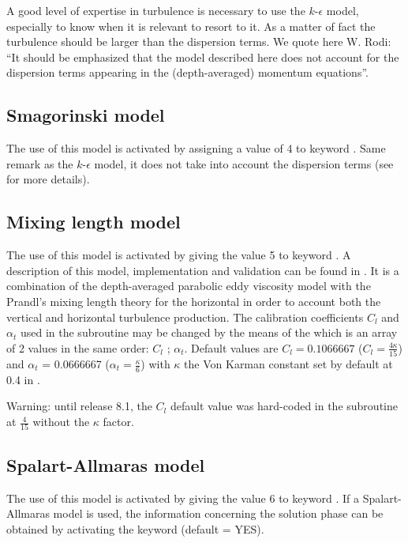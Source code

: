 A good level of expertise in turbulence is necessary to use the $k$-$\epsilon$
model, especially to know when it is relevant to resort to it.
As a matter of fact the turbulence should be larger than the dispersion terms.
We quote here W. Rodi:
``It should be emphasized that the model described here does not account
for the dispersion terms appearing in the (depth-averaged) momentum equations''.


\subsection{Smagorinski model}

The use of this model is activated by assigning a value of 4 to keyword
.
Same remark as the $k$-$\epsilon$ model, it does not take into account the
dispersion terms (see \cite{Smagorinsky1963} for more details).


\subsection{Mixing length model}

The use of this model is activated by giving the value 5 to keyword
.
A description of this model, implementation and validation can be found in
\cite{Dorfmann2016}.
It is a combination of the depth-averaged parabolic eddy viscosity model
with the Prandl's mixing length theory for the horizontal in order to account
both the vertical and horizontal turbulence production.
The calibration coefficients $C_l$ and $\alpha_t$ used in the
 subroutine may be changed by the means of the
 which is an array of 2 values
in the same order: $C_l$ ; $\alpha_t$.
Default values are $C_l = 0.1066667$ ($C_l = \frac{4 \kappa}{15}$) and
$\alpha_t$ = 0.0666667 ($\alpha_t = \frac{\kappa}{6}$)
with $\kappa$ the Von Karman constant set by default at 0.4 in .

Warning: until release 8.1, the $C_l$ default value was hard-coded in the
 subroutine at $\frac{4}{15}$ without the $\kappa$ factor.

\subsection{Spalart-Allmaras model}

The use of this model is activated by giving the value 6 to keyword
.
If a Spalart-Allmaras model is used, the information concerning
the solution phase can be obtained by activating the keyword
 (default = YES).

